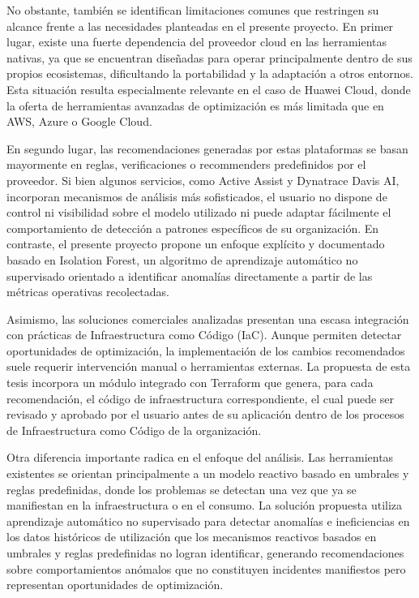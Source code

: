 No obstante, también se identifican limitaciones comunes que restringen su alcance frente a las necesidades planteadas en el presente proyecto. En primer lugar, existe una fuerte dependencia del proveedor cloud en las herramientas nativas, ya que se encuentran diseñadas para operar principalmente dentro de sus propios ecosistemas, dificultando la portabilidad y la adaptación a otros entornos. Esta situación resulta especialmente relevante en el caso de Huawei Cloud, donde la oferta de herramientas avanzadas de optimización es más limitada que en AWS, Azure o Google Cloud.

En segundo lugar, las recomendaciones generadas por estas plataformas se basan mayormente en reglas, verificaciones o recommenders predefinidos por el proveedor. Si bien algunos servicios, como Active Assist y Dynatrace Davis AI, incorporan mecanismos de análisis más sofisticados, el usuario no dispone de control ni visibilidad sobre el modelo utilizado ni puede adaptar fácilmente el comportamiento de detección a patrones específicos de su organización. En contraste, el presente proyecto propone un enfoque explícito y documentado basado en Isolation Forest, un algoritmo de aprendizaje automático no supervisado orientado a identificar anomalías directamente a partir de las métricas operativas recolectadas.

Asimismo, las soluciones comerciales analizadas presentan una escasa integración con prácticas de Infraestructura como Código (IaC). Aunque permiten detectar oportunidades de optimización, la implementación de los cambios recomendados suele requerir intervención manual o herramientas externas. La propuesta de esta tesis incorpora un módulo integrado con Terraform que genera, para cada recomendación, el código de infraestructura correspondiente, el cual puede ser revisado y aprobado por el usuario antes de su aplicación dentro de los procesos de Infraestructura como Código de la organización.

Otra diferencia importante radica en el enfoque del análisis. Las herramientas existentes se orientan principalmente a un modelo reactivo basado en umbrales y reglas predefinidas, donde los problemas se detectan una vez que ya se manifiestan en la infraestructura o en el consumo. La solución propuesta utiliza aprendizaje automático no supervisado para detectar anomalías e ineficiencias en los datos históricos de utilización que los mecanismos reactivos basados en umbrales y reglas predefinidas no logran identificar, generando recomendaciones sobre comportamientos anómalos que no constituyen incidentes manifiestos pero representan oportunidades de optimización.

